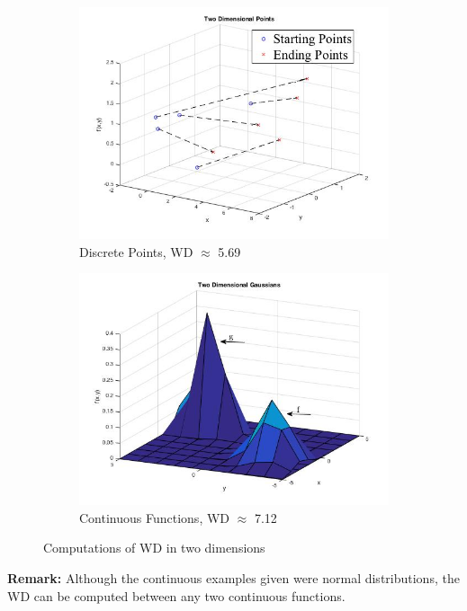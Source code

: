 \documentclass[10pt]{article}
\begin{document}
 \begin{figure}[H]
\centering
\begin{subfigure}{.45\textwidth}
  \centering
  \includegraphics[scale = .4]{2DPoints.jpg}
  \caption{Discrete Points, WD $\approx$ 5.69}
  \label{fig: 2Ddiscreet}
\end{subfigure}%
\begin{subfigure}{.45\textwidth}
  \centering
  \includegraphics[scale = .4]{2DGaussians.jpg}
  \caption{Continuous Functions, WD $\approx$ 7.12}
  \label{fig: 2DContinuous}
\end{subfigure}
\caption{Computations of WD in two dimensions}
\label{fig:1DWDCalculations}
\end{figure}
\noindent \textbf{Remark:} Although the continuous examples given were normal distributions, the WD can be computed between any two continuous functions. 
\end{document}
